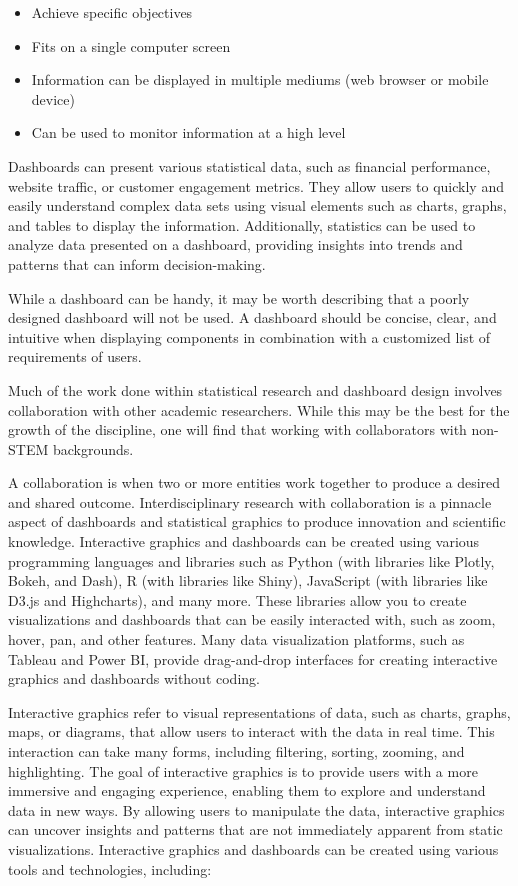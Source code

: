 \documentclass[print]{nuthesis}
\providecommand{\tightlist}{%
  \setlength{\itemsep}{0pt}\setlength{\parskip}{0pt}}
\begin{document}
\begin{itemize}
\tightlist
\item
  Achieve specific objectives
\item
  Fits on a single computer screen
\item
  Information can be displayed in multiple mediums (web browser or mobile device)
\item
  Can be used to monitor information at a high level
\end{itemize}

Dashboards can present various statistical data, such as financial performance, website traffic, or customer engagement metrics. They allow users to quickly and easily understand complex data sets using visual elements such as charts, graphs, and tables to display the information. Additionally, statistics can be used to analyze data presented on a dashboard, providing insights into trends and patterns that can inform decision-making.

While a dashboard can be handy, it may be worth describing that a poorly designed dashboard will not be used. A dashboard should be concise, clear, and intuitive when displaying components in combination with a customized list of requirements of users.

Much of the work done within statistical research and dashboard design involves collaboration with other academic researchers. While this may be the best for the growth of the discipline, one will find that working with collaborators with non-STEM backgrounds.

A collaboration is when two or more entities work together to produce a desired and shared outcome. Interdisciplinary research with collaboration is a pinnacle aspect of dashboards and statistical graphics to produce innovation and scientific knowledge.
Interactive graphics and dashboards can be created using various programming languages and libraries such as Python (with libraries like Plotly, Bokeh, and Dash), R (with libraries like Shiny), JavaScript (with libraries like D3.js and Highcharts), and many more. These libraries allow you to create visualizations and dashboards that can be easily interacted with, such as zoom, hover, pan, and other features. Many data visualization platforms, such as Tableau and Power BI, provide drag-and-drop interfaces for creating interactive graphics and dashboards without coding.

Interactive graphics refer to visual representations of data, such as charts, graphs, maps, or diagrams, that allow users to interact with the data in real time. This interaction can take many forms, including filtering, sorting, zooming, and highlighting. The goal of interactive graphics is to provide users with a more immersive and engaging experience, enabling them to explore and understand data in new ways. By allowing users to manipulate the data, interactive graphics can uncover insights and patterns that are not immediately apparent from static visualizations. Interactive graphics and dashboards can be created using various tools and technologies, including:
\end{document}
